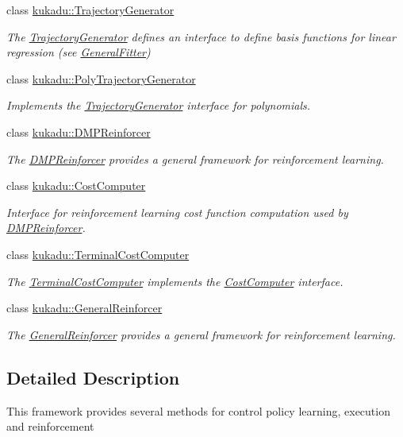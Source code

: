 \begin{DoxyCompactItemize}
class \hyperlink{classkukadu_1_1TrajectoryGenerator}{kukadu\+::\+Trajectory\+Generator}
\begin{DoxyCompactList}\small\item\em The \hyperlink{classkukadu_1_1TrajectoryGenerator}{Trajectory\+Generator} defines an interface to define basis functions for linear regression (see \hyperlink{classkukadu_1_1GeneralFitter}{General\+Fitter}) \end{DoxyCompactList}\item 
class \hyperlink{classkukadu_1_1PolyTrajectoryGenerator}{kukadu\+::\+Poly\+Trajectory\+Generator}
\begin{DoxyCompactList}\small\item\em Implements the \hyperlink{classkukadu_1_1TrajectoryGenerator}{Trajectory\+Generator} interface for polynomials. \end{DoxyCompactList}\item 
class \hyperlink{classkukadu_1_1DMPReinforcer}{kukadu\+::\+D\+M\+P\+Reinforcer}
\begin{DoxyCompactList}\small\item\em The \hyperlink{classkukadu_1_1DMPReinforcer}{D\+M\+P\+Reinforcer} provides a general framework for reinforcement learning. \end{DoxyCompactList}\item 
class \hyperlink{classkukadu_1_1CostComputer}{kukadu\+::\+Cost\+Computer}
\begin{DoxyCompactList}\small\item\em Interface for reinforcement learning cost function computation used by \hyperlink{classkukadu_1_1DMPReinforcer}{D\+M\+P\+Reinforcer}. \end{DoxyCompactList}\item 
class \hyperlink{classkukadu_1_1TerminalCostComputer}{kukadu\+::\+Terminal\+Cost\+Computer}
\begin{DoxyCompactList}\small\item\em The \hyperlink{classkukadu_1_1TerminalCostComputer}{Terminal\+Cost\+Computer} implements the \hyperlink{classkukadu_1_1CostComputer}{Cost\+Computer} interface. \end{DoxyCompactList}\item 
class \hyperlink{classkukadu_1_1GeneralReinforcer}{kukadu\+::\+General\+Reinforcer}
\begin{DoxyCompactList}\small\item\em The \hyperlink{classkukadu_1_1GeneralReinforcer}{General\+Reinforcer} provides a general framework for reinforcement learning. \end{DoxyCompactList}\end{DoxyCompactItemize}


\subsection{Detailed Description}
This framework provides several methods for control policy learning, execution and reinforcement 